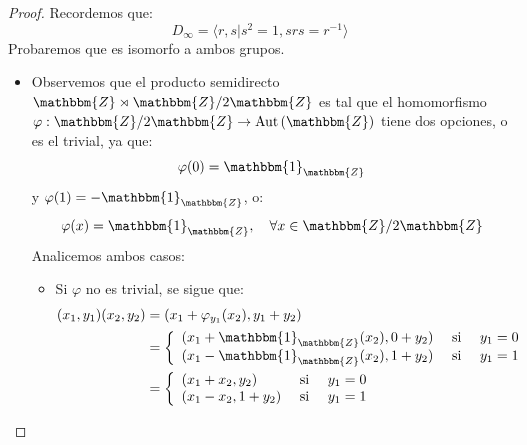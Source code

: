 \documentclass[12pt]{report}
\newcounter{it}
\theoremstyle{largebreak}
\newcommand\cf[3]{\ensuremath{#1:#2\rightarrow#3}}
\newcommand{\bbm}[1]{\ensuremath{\mathbbm{#1}}}
\newcommand\Aut[1]{\ensuremath{\textup{Aut}\left(#1\right)}}
\newcommand{\gen}[1]{\ensuremath{\langle#1\rangle}}
\begin{document}
    \begin{proof}
        Recordemos que:
        \begin{equation*}
            D_\infty=\gen{r,s\Big|s^2=1,srs=r^{-1}}
        \end{equation*}
        Probaremos que es isomorfo a ambos grupos.
        \begin{itemize}
            \item Observemos que el producto semidirecto $\bbm{Z}\rtimes\bbm{Z}/2\bbm{Z}$ es tal que el homomorfismo $\cf{\varphi}{\bbm{Z}/2\bbm{Z}}{\Aut{\bbm{Z}}}$ tiene dos opciones, o es el trivial, ya que:
            \begin{equation*}
                \varphi(0)=\bbm{1}_{\bbm{Z}}
            \end{equation*}
            y $\varphi(1)=-\bbm{1}_\bbm{Z}$, o:
            \begin{equation*}
                \varphi(x)=\bbm{1}_{\bbm{Z}},\quad\forall x\in\bbm{Z}/2\bbm{Z}
            \end{equation*}
            Analicemos ambos casos:
            \begin{itemize}
                \item Si $\varphi$ no es trivial, se sigue que:
                \begin{equation*}
                    \begin{split}
                        (x_1,y_1)(x_2,y_2)&=(x_1+\varphi_{ y_1}(x_2),y_1+y_2)\\
                        &=\left\{
                            \begin{array}{lcr}
                                (x_1+\bbm{1}_\bbm{Z}(x_2),0+y_2) & \textup{ si } & y_1=0 \\
                                (x_1-\bbm{1}_\bbm{Z}(x_2),1+y_2) & \textup{ si } & y_1=1 \\
                            \end{array}
                        \right.\\
                        &=\left\{
                            \begin{array}{lcr}
                                (x_1+x_2,y_2) & \textup{ si } & y_1=0 \\
                                (x_1-x_2,1+y_2) & \textup{ si } & y_1=1 \\
                            \end{array}
                        \right.\\
                    \end{split}

\end{equation*}
\end{itemize}
\end{itemize}
\end{proof}
\end{document}
